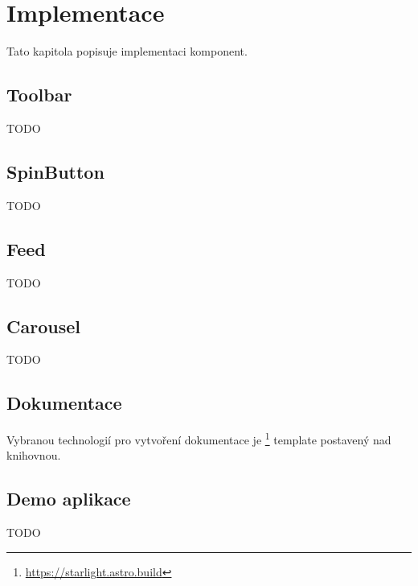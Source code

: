 \chapter{Implementace}

Tato kapitola popisuje implementaci komponent.

\section{Toolbar}

TODO

\section{SpinButton}

TODO

\section{Feed}

TODO

\section{Carousel}

TODO

\section{Dokumentace}

Vybranou technologií pro vytvoření dokumentace je \footnote{\url{https://starlight.astro.build}} template postavený nad  knihovnou.


\section{Demo aplikace}

TODO
